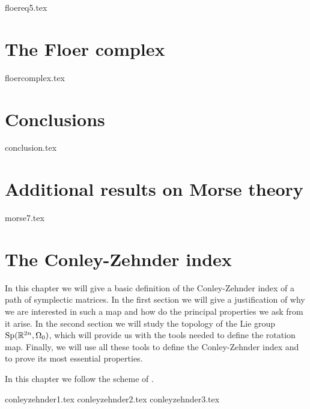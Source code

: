 \documentclass[a4paper,11pt]{book}
\begin{document}
 {floereq5.tex}

\chapter{The Floer complex}
{floercomplex.tex}

\chapter*{Conclusions}
{conclusion.tex}

\begin{appendices}
\chapter{Additional results on Morse theory}
{morse7.tex}

\chapter{The Conley-Zehnder index} \label{chapter:conley_zehnder}

In this chapter we will give a basic definition of the Conley-Zehnder index of a path of symplectic matrices. In the first section we will give a justification of why we are interested in such a map and how do the principal properties we ask from it arise. In the second section we will study the topology of the Lie group $\mathrm{Sp}(\mathbb{R}^{2n},\Omega_0)$, which will provide us with the tools needed to define the rotation map. Finally, we will use all these tools to define the Conley-Zehnder index and to prove its most essential properties.

In this chapter we follow the scheme of \cite{gutt2012conley}.

{conleyzehnder1.tex}
{conleyzehnder2.tex}
{conleyzehnder3.tex}
\end{appendices}



\end{document}
